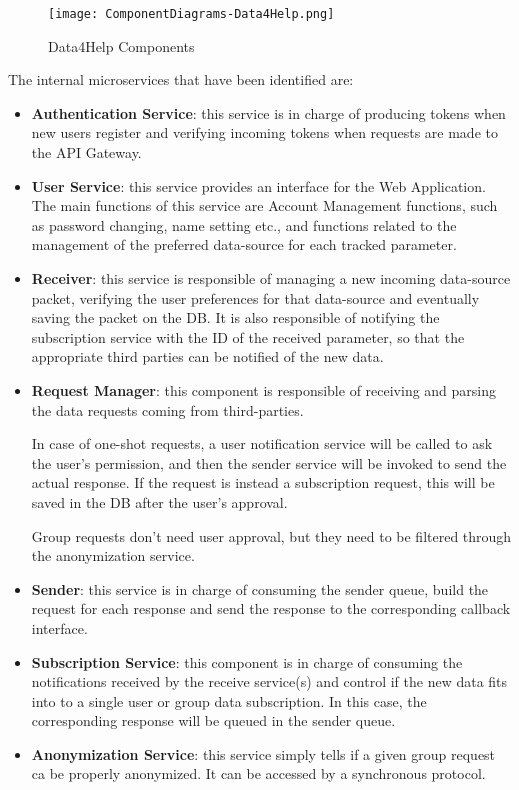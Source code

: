 \FloatBarrier
\begin{figure}[!h]
	\centering
	\texttt{[image: ComponentDiagrams-Data4Help.png]}
	\caption{Data4Help Components}
\end{figure}

\FloatBarrier

The internal microservices that have been identified are:
\begin{itemize}
	\item \textbf{Authentication Service}: this service is in charge of producing tokens when new users register and verifying incoming tokens when requests are made to the API Gateway.
	\item \textbf{User Service}: this service provides an interface for the Web Application. The main functions of this service are Account Management functions, such as password changing, name setting etc., and functions related to the management of the preferred data-source for each tracked parameter.
	\item \textbf{Receiver}: this service is responsible of managing a new incoming data-source packet, verifying the user preferences for that data-source and eventually saving the packet on the DB. It is also responsible of notifying the subscription service with the ID of the received parameter, so that the appropriate third parties can be notified of the new data.
	\item \textbf{Request Manager}: this component is responsible of receiving and parsing the data requests coming from third-parties.
	
	In case of one-shot requests, a user notification service will be called to ask the user's permission, and then the sender service will be invoked to send the actual response.
	If the request is instead a subscription request, this will be saved in the DB after the user's approval.
	
	Group requests don't need user approval, but they need to be filtered through the anonymization service.
	\item \textbf{Sender}: this service is in charge of consuming the sender queue, build the request for each response and send the response to the corresponding callback interface.
	\item \textbf{Subscription Service}: this component is in charge of consuming the notifications received by the receive service(s) and control if the new data fits into to a single user or group data subscription. In this case, the corresponding response will be queued in the sender queue.
	\item \textbf{Anonymization Service}: this service simply tells if a given group request ca be properly anonymized. It can be accessed by a synchronous protocol.
\end{itemize}

